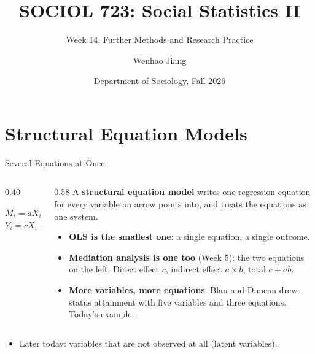 \documentclass[aspectratio=169,11pt,xcolor=dvipsnames]{beamer}
\title[SOCIOL 723]{SOCIOL 723: Social Statistics II\\[-2pt]}
\subtitle{Week 14, Further Methods and Research Practice\\[-6pt]}
\author[Jiang]{Wenhao Jiang\vspace{-2.5em}}
\institute[Duke]{}
\date{Department of Sociology, Fall 2026}
\begin{document}
\begin{frame}[plain]
  \titlepage
\end{frame}

\section[SEM]{Structural Equation Models}
\begin{frame}\sectionpage\end{frame}

\begin{frame}{Several Equations at Once}
\begin{columns}[c]
\begin{column}{0.40\linewidth}
\centering
{}
\vskip4pt
$M_i = a X_i + e_{Mi}$\\[2pt]
$Y_i = c X_i + b M_i + e_{Yi}$
\end{column}
\begin{column}{0.58\linewidth}
A \textbf{structural equation model} writes one regression equation for every variable an arrow
points into, and treats the equations as one system.
\begin{itemize}\itemsep5pt
  \item \textbf{OLS is the smallest one}: a single equation, a single outcome.
  \item \textbf{Mediation analysis is one too} (Week 5): the two equations on the left. Direct
        effect $c$, indirect effect $a \times b$, total $c + ab$.
  \item \textbf{More variables, more equations}: Blau and Duncan drew status attainment with five
        variables and three equations. Today's example.
\end{itemize}
\end{column}
\end{columns}
\vskip5pt
\begin{itemize}\itemsep3pt
  \item Later today: variables that are not observed at all (latent variables).
\end{itemize}
\end{frame}
\end{document}
